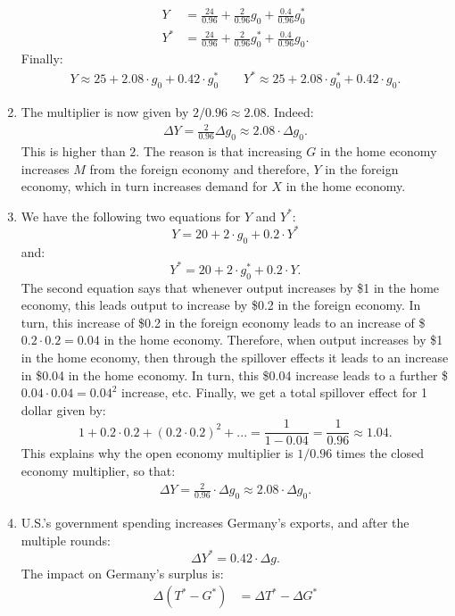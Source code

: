 \documentclass[]{book}
\begin{document}
\begin{enumerate}
\[\begin{aligned}
  Y&=\frac{24}{0.96}+\frac{2}{0.96}g_0+\frac{0.4}{0.96}g_0^{*} \\ Y^{*}&=\frac{24}{0.96}+\frac{2}{0.96}g_0^{*}+\frac{0.4}{0.96}g_0.
  \end{aligned}
  \] Finally: \[
  \begin{aligned}
  \boxed{Y\approx25+2.08 \cdot g_0+0.42 \cdot g_0^{*}} \qquad \boxed{Y^{*}\approx25+2.08 \cdot g_0^{*}+0.42 \cdot g_0}.
  \end{aligned}
  \]
\item
  The multiplier is now given by \(2/0.96 \approx 2.08\). Indeed: \[
  \begin{aligned}
  \boxed{\Delta Y = \frac{2}{0.96}\Delta g_0 \approx 2.08  \cdot \Delta g_0}.
  \end{aligned}
  \] This is higher than \(2\). The reason is that increasing \(G\) in
  the home economy increases \(M\) from the foreign economy and
  therefore, \(Y\) in the foreign economy, which in turn increases
  demand for \(X\) in the home economy.
\item
  We have the following two equations for \(Y\) and \(Y^{*}\):
  \[Y = 20 + 2 \cdot g_0 + 0.2 \cdot Y^{*}\] and:
  \[Y^{*}=20+2 \cdot g_0^{*} + 0.2 \cdot Y.\] The second equation says
  that whenever output increases by \$1 in the home economy, this leads
  output to increase by \$0.2 in the foreign economy. In turn, this
  increase of \$0.2 in the foreign economy leads to an increase of
  \$\(0.2 \cdot 0.2 = 0.04\) in the home economy. Therefore, when output
  increases by \$1 in the home economy, then through the spillover
  effects it leads to an increase in \$0.04 in the home economy. In
  turn, this \$0.04 increase leads to a further
  \$\(0.04 \cdot 0.04 = 0.04^2\) increase, etc. Finally, we get a total
  spillover effect for 1 dollar given by:
  \[\boxed{1+0.2\cdot 0.2 + (0.2\cdot 0.2)^2 + ... = \frac{1}{1-0.04} = \frac{1}{0.96} \approx 1.04}.\]
  This explains why the open economy multiplier is \(1/0.96\) times the
  closed economy multiplier, so that: \[
  \begin{aligned}
  \boxed{\Delta Y = \frac{2}{0.96} \cdot \Delta g_0\approx 2.08 \cdot \Delta g_0}.
  \end{aligned}
  \]
\item
  U.S.'s government spending increases Germany's exports, and after the
  multiple rounds: \[\Delta Y^{*} = 0.42 \cdot \Delta g.\] The impact on
  Germany's surplus is: \[
  \begin{aligned}
  \Delta (T^{*}-G^{*}) &= \Delta T^{*} - \Delta G^{*}\\

\end{aligned}\]
\end{enumerate}
\end{document}

